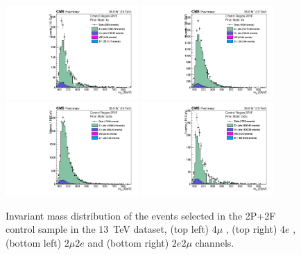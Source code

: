 \begin{figure}[!htb]
\begin{center}
    {\includegraphics [width=0.45\textwidth] {Figures/RedBkg/HZZ_2P2Fuw_ZZMass_4m.pdf}}
    {\includegraphics [width=0.45\textwidth] {Figures/RedBkg/HZZ_2P2Fuw_ZZMass_4e.pdf}} \\
    {\includegraphics [width=0.45\textwidth] {Figures/RedBkg/HZZ_2P2Fuw_ZZMass_2m2e.pdf}}
    {\includegraphics [width=0.45\textwidth] {Figures/RedBkg/HZZ_2P2Fuw_ZZMass_2e2m.pdf}} \\
\caption{
Invariant mass distribution of the events selected in the 2P+2F control sample in the
$13$~TeV dataset, (top left)  $4\mu$ , (top right) $4e$ , (bottom left)  $2\mu2e$ and (bottom right)  $2e2\mu$ channels.
}
\label{fig:2P2F_dataMC}
\end{center}
\end{figure}


